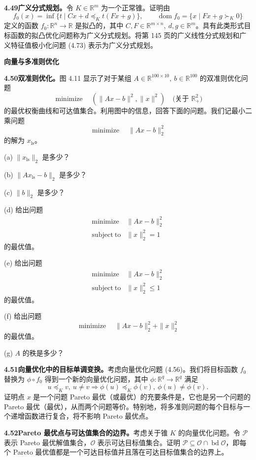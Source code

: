 \documentclass[UTF8, 12pt, fontset=fandol, oneside]{ctexart}
\begin{document}
\noindent\textbf{4.49\quad 广义分式规划。}\quad 令 $K\in\mathbb{R}^m$ 为一个正常锥。证明由
\[
f_0(x)=\inf\{t\mid Cx+d\preceq_K t(Fx+g)\},\qquad \operatorname{dom} f_0=\{x\mid Fx+g\succ_K0\}
\]
定义的函数 $f_0:\mathbb{R}^n\to\mathbb{R}$ 是拟凸的，其中 $C,F\in\mathbb{R}^{m\times n},\ d,g\in\mathbb{R}^m$。具有此类形式目标函数的拟凸优化问题称为广义分式规划。将第 145 页的广义线性分式规划和广义特征值极小化问题 (4.73) 表示为广义分式规划。

\noindent\textbf{向量与多准则优化}

\noindent\textbf{4.50\quad 双准则优化。}\quad 图 4.11 显示了对于某组 $A\in\mathbb{R}^{100\times10},\ b\in\mathbb{R}^{100}$ 的双准则优化问题
\[
\mathop{\mathrm{minimize}}\quad (\|Ax-b\|^2,\|x\|^2)\quad \text{(关于 }\mathbb{R}_+^2\text{)}
\]
的最优权衡曲线和可达值集合。利用图中的信息，回答下面的问题。我们记最小二乘问题
\[
\mathop{\mathrm{minimize}}\quad \|Ax-b\|_2^2
\]
的解为 $x_{\mathrm{ls}}$。

(a) $\|x_{\mathrm{ls}}\|_2$ 是多少？

(b) $\|Ax_{\mathrm{ls}}-b\|_2$ 是多少？

(c) $\|b\|_2$ 是多少？

(d) 给出问题
\[
\begin{array}{ll}
\mathop{\mathrm{minimize}} & \|Ax-b\|_2^2\\
\mathrm{subject\ to} & \|x\|_2^2=1
\end{array}
\]
的最优值。

(e) 给出问题
\[
\begin{array}{ll}
\mathop{\mathrm{minimize}} & \|Ax-b\|_2^2\\
\mathrm{subject\ to} & \|x\|_2^2\leq1
\end{array}
\]
的最优值。

(f) 给出问题
\[
\mathop{\mathrm{minimize}}\quad \|Ax-b\|_2^2+\|x\|_2^2
\]
的最优值。

(g) $A$ 的秩是多少？

\noindent\textbf{4.51\quad 向量优化中的目标单调变换。}\quad 考虑向量优化问题 (4.56)。我们将目标函数 $f_0$ 替换为 $\phi\circ f_0$ 得到一个新的向量优化问题，其中 $\phi:\mathbb{R}^q\to\mathbb{R}^q$ 满足
\[
u\preceq_K v,\ u\neq v\Longrightarrow \phi(u)\preceq_K\phi(v),\ \phi(u)\neq\phi(v).
\]
证明点 $x$ 是一个问题 Pareto 最优（或最优）的充要条件是，它也是另一个问题的 Pareto 最优（最优），从而两个问题等价。特别地，将多准则问题的每个目标与一个递增函数进行复合，将不影响 Pareto 最优点。

\noindent\textbf{4.52\quad Pareto 最优点与可达值集合的边界。}\quad 考虑关于锥 $K$ 的向量优化问题。令 $\mathcal{P}$ 表示 Pareto 最优解值集合，$\mathcal{O}$ 表示可达目标值集合。证明 $\mathcal{P}\subseteq\mathcal{O}\cap\operatorname{bd}\mathcal{O}$，即每个 Pareto 最优值都是一个可达目标值并且落在可达目标值集合的边界上。
\end{document}
